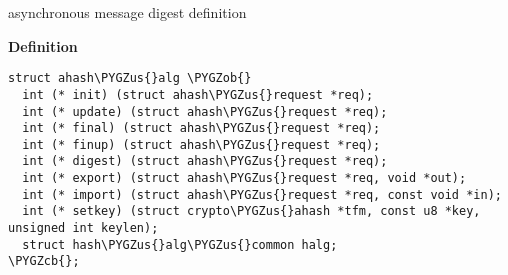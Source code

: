 \documentclass[a4paper,8pt,english]{sphinxmanual}
\def\PYGZus{\char`\_}
\def\PYGZob{\char`\{}
\def\PYGZcb{\char`\}}
\begin{document}
\begin{fulllineitems}
\label{crypto/api-digest:c.ahash_alg}
asynchronous message digest definition

\end{fulllineitems}


\textbf{Definition}

\begin{Verbatim}[commandchars=\\\{\}]
struct ahash\PYGZus{}alg \PYGZob{}
  int (* init) (struct ahash\PYGZus{}request *req);
  int (* update) (struct ahash\PYGZus{}request *req);
  int (* final) (struct ahash\PYGZus{}request *req);
  int (* finup) (struct ahash\PYGZus{}request *req);
  int (* digest) (struct ahash\PYGZus{}request *req);
  int (* export) (struct ahash\PYGZus{}request *req, void *out);
  int (* import) (struct ahash\PYGZus{}request *req, const void *in);
  int (* setkey) (struct crypto\PYGZus{}ahash *tfm, const u8 *key, unsigned int keylen);
  struct hash\PYGZus{}alg\PYGZus{}common halg;
\PYGZcb{};
\end{Verbatim}
\end{document}
